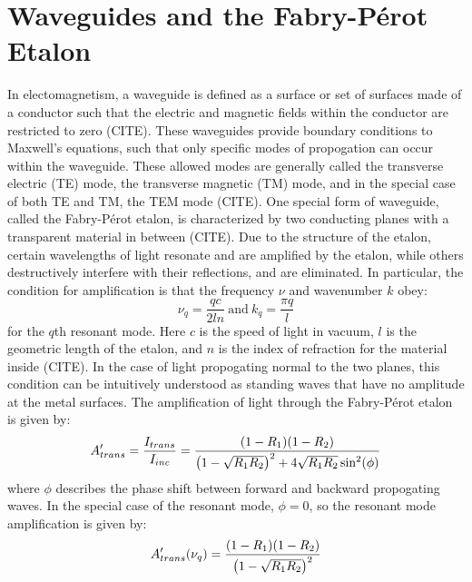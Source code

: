 \documentclass{report}
\begin{document}
    \section{Waveguides and the Fabry-P\'erot Etalon}
        In electomagnetism, a waveguide is defined as a surface or set of surfaces made of a conductor such that the electric and magnetic fields within the conductor are restricted to zero (CITE). These waveguides provide boundary conditions to Maxwell's equations, such that only specific modes of propogation can occur within the waveguide. These allowed modes are generally called the transverse electric (TE) mode, the transverse magnetic (TM) mode, and in the special case of both TE and TM, the TEM mode (CITE). One special form of waveguide, called the Fabry-P\'erot etalon, is characterized by two conducting planes with a transparent material in between (CITE). Due to the structure of the etalon, certain wavelengths of light resonate and are amplified by the etalon, while others destructively interfere with their reflections, and are eliminated. In particular, the condition for amplification is that the frequency $\nu$ and wavenumber $k$ obey:
        \begin{equation}
            \nu_q=\frac{qc}{2ln}\ \mathrm{and}\ k_q=\frac{\pi q}{l}
        \end{equation}
        for the $q$th resonant mode. Here $c$ is the speed of light in vacuum, $l$ is the geometric length of the etalon, and $n$ is the index of refraction for the material inside (CITE). In the case of light propogating normal to the two planes, this condition can be intuitively understood as standing waves that have no amplitude at the metal surfaces. The amplification of light through the Fabry-P\'erot etalon is given by:
        \begin{equation}
            A'_{trans}=\frac{I_{trans}}{I_{inc}}=\frac{\qty(1-R_1)\qty(1-R_2)}{\qty(1-\sqrt{R_1R_2})^2+4\sqrt{R_1R_2}\sin^2(\phi)}
        \end{equation}
        where $\phi$ describes the phase shift between forward and backward propogating waves. In the special case of the resonant mode, $\phi=0$, so the resonant mode amplification is given by:
        \begin{equation}
            A'_{trans}\qty(\nu_q)=\frac{\qty(1-R_1)\qty(1-R_2)}{\qty(1-\sqrt{R_1R_2})^2}
        \end{equation}
        
\end{document}
